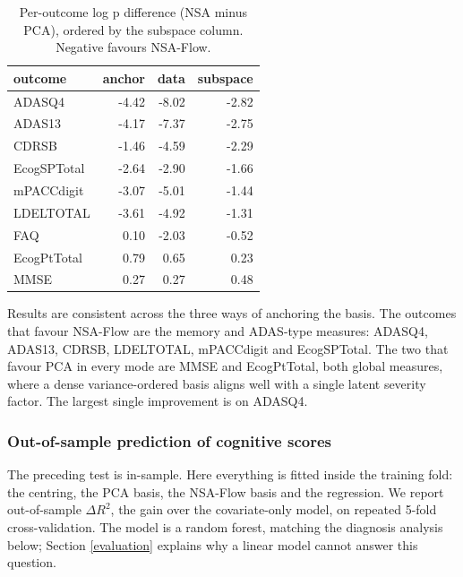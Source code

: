 \documentclass[
]{article}
\begin{document}
\begin{table}[!h]
\centering
\caption{\label{tab:coginsampleper}Per-outcome log p difference (NSA minus PCA), ordered by the subspace column. Negative favours NSA-Flow.}
\centering
\fontsize{9}{11}\selectfont
\begin{tabular}[t]{lrrr}
\toprule
outcome & anchor & data & subspace\\
\midrule
ADASQ4 & -4.42 & -8.02 & -2.82\\
ADAS13 & -4.17 & -7.37 & -2.75\\
CDRSB & -1.46 & -4.59 & -2.29\\
EcogSPTotal & -2.64 & -2.90 & -1.66\\
mPACCdigit & -3.07 & -5.01 & -1.44\\
LDELTOTAL & -3.61 & -4.92 & -1.31\\
FAQ & 0.10 & -2.03 & -0.52\\
EcogPtTotal & 0.79 & 0.65 & 0.23\\
MMSE & 0.27 & 0.27 & 0.48\\
\bottomrule
\end{tabular}
\end{table}

Results are consistent across the three ways of anchoring the basis. The
outcomes that favour NSA-Flow are the memory and ADAS-type measures: ADASQ4,
ADAS13, CDRSB, LDELTOTAL, mPACCdigit and EcogSPTotal. The two that favour PCA in
every mode are MMSE and EcogPtTotal, both global measures, where a dense
variance-ordered basis aligns well with a single latent severity factor. The
largest single improvement is on ADASQ4.

\subsubsection{Out-of-sample prediction of cognitive scores}\label{out-of-sample-prediction-of-cognitive-scores}

The preceding test is in-sample. Here everything is fitted inside the training
fold: the centring, the PCA basis, the NSA-Flow basis and the regression. We
report out-of-sample \(\Delta R^2\), the gain over the covariate-only model, on
repeated 5-fold cross-validation. The model is a random forest, matching the
diagnosis analysis below; Section \ref{evaluation} explains why a linear model
cannot answer this question.
\end{document}
